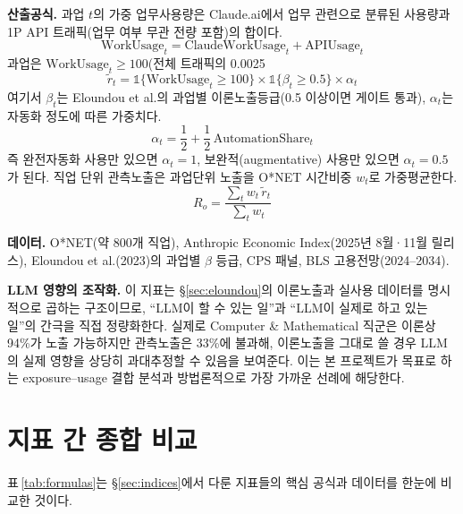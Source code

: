 \documentclass[11pt]{article}
\begin{document}
\textbf{산출공식.} 과업 $t$의 가중 업무사용량은 Claude.ai에서 업무 관련으로 분류된 사용량과 1P API 트래픽(업무 여부 무관 전량 포함)의 합이다.
\begin{equation}
\text{WorkUsage}_t = \text{ClaudeWorkUsage}_t + \text{APIUsage}_t
\end{equation}
과업은 $\text{WorkUsage}_t \geq 100$(전체 트래픽의 0.0025%
\begin{equation}
\tilde{r}_t = \mathbb{1}\{\text{WorkUsage}_t \geq 100\} \times \mathbb{1}\{\beta_t \geq 0.5\} \times \alpha_t
\label{eq:massenkoff-task}
\end{equation}
여기서 $\beta_t$는 Eloundou et al.의 과업별 이론노출등급(0.5 이상이면 게이트 통과), $\alpha_t$는 자동화 정도에 따른 가중치다.
\begin{equation}
\alpha_t = \frac{1}{2} + \frac{1}{2}\,\text{AutomationShare}_t
\end{equation}
즉 완전자동화 사용만 있으면 $\alpha_t=1$, 보완적(augmentative) 사용만 있으면 $\alpha_t=0.5$가 된다. 직업 단위 관측노출은 과업단위 노출을 O*NET 시간비중 $w_t$로 가중평균한다.
\begin{equation}
R_o = \frac{\sum_t w_t\, \tilde{r}_t}{\sum_t w_t}
\label{eq:massenkoff-occ}
\end{equation}

\textbf{데이터.} O*NET(약 800개 직업), Anthropic Economic Index(2025년 8월·11월 릴리스), Eloundou et al.(2023)의 과업별 $\beta$ 등급, CPS 패널, BLS 고용전망(2024--2034).

\textbf{LLM 영향의 조작화.} 이 지표는 \S\ref{sec:eloundou}의 이론노출과 실사용 데이터를 명시적으로 곱하는 구조이므로, ``LLM이 할 수 있는 일''과 ``LLM이 실제로 하고 있는 일''의 간극을 직접 정량화한다. 실제로 Computer \& Mathematical 직군은 이론상 94\%가 노출 가능하지만 관측노출은 33\%에 불과해, 이론노출을 그대로 쓸 경우 LLM의 실제 영향을 상당히 과대추정할 수 있음을 보여준다. 이는 본 프로젝트가 목표로 하는 exposure--usage 결합 분석과 방법론적으로 가장 가까운 선례에 해당한다.

\section{지표 간 종합 비교}
\label{sec:comparison}

표\,\ref{tab:formulas}는 \S\ref{sec:indices}에서 다룬 지표들의 핵심 공식과 데이터를 한눈에 비교한 것이다.
\end{document}
